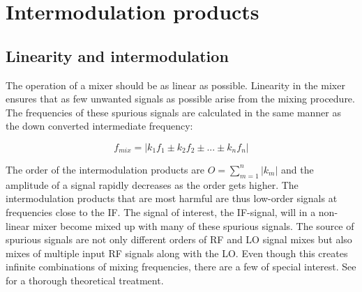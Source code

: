 	\section{Intermodulation products}
		\subsection{Linearity and intermodulation}
			The operation of a mixer should be as linear as possible. Linearity in the mixer ensures that as few unwanted signals as possible arise from the mixing procedure. The frequencies of these spurious signals are calculated in the same manner as the down converted intermediate frequency: \autocite{bahl03}

			\begin{equation}\label{eq:spurs}
				f_{mix} = |k_1f_1\pm k_2f_2 \pm ... \pm k_nf_n|
			\end{equation}

			The order of the intermodulation products are $O=\sum_{m=1}^n|k_m|$ and the amplitude of a signal rapidly decreases as the order gets higher. The intermodulation products that are most harmful are thus low-order signals at frequencies close to the IF. The signal of interest, the IF-signal, will in a non-linear mixer become mixed up with many of these spurious signals. The source of spurious signals are not only different orders of RF and LO signal mixes but also mixes of multiple input RF signals along with the LO. Even though this creates infinite combinations of mixing frequencies, there are a few of special interest. See \citeauthor{kundert02} for a thorough theoretical treatment\autocite{kundert02}.


